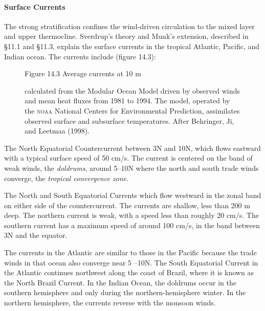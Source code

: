 \paragraph{Surface Currents}
The strong
stratification confines the wind-driven circulation to the mixed
layer and upper
thermocline. Sverdrup's theory and Munk's
extension, described in \S11.1 and \S11.3, explain the surface
currents in the tropical Atlantic, Pacific, and Indian ocean. The
currents include (figure 14.3):

\begin{figure}[t!]
\footnotesize
Figure 14.3 Average currents at 10 m \rule{0pt}{3ex}calculated from
the Modular Ocean Model driven by observed winds and mean heat
fluxes from 1981 to 1994. The model, operated by the
\textsc{noaa} National Centers for Environmental Prediction,
assimilates observed surface and subsurface temperatures. After
Behringer, Ji, and Leetmaa (1998).
\label{fig:EqCurr}
\vspace{-4ex}
\end{figure}

\begin{enumerate}
\vitem The North Equatorial Countercurrent between 3\degrees N and
10\degrees N, which flows eastward with a typical surface speed of 50
cm/s. The current is centered on the band of weak winds, the
\textit{doldrums}, around 5--10\degrees N where
the north and south trade winds converge, the \textit{tropical
  convergence zone}.

\vitem The North and South Equatorial Currents which flow westward in
the zonal band on either side of the countercurrent. The currents are
shallow, less than 200 m deep. The northern current is weak, with a
speed less than roughly 20 cm/s.  The southern current has a maximum
speed of around 100 cm/s, in the band between 3\degrees N and the
equator.
\end{enumerate}

The currents in the Atlantic are similar to those in the Pacific
because the trade winds in that ocean also converge near 5\degrees
--10\degrees N.  The South Equatorial Current in the Atlantic
continues northwest along the coast of Brazil, where it is known as
the North Brazil Current. In the Indian Ocean, the doldrums occur in
the southern hemisphere and only during the northern-hemisphere
winter. In the northern hemisphere, the currents reverse with the
monsoon winds.

